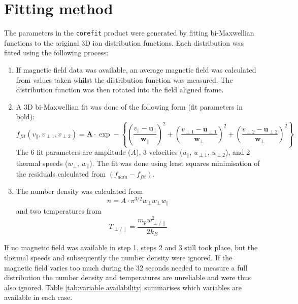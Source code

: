 \documentclass[11pt,a4paper]{article}
\begin{document}
\section{Fitting method}
The parameters in the \texttt{corefit} product were generated by fitting bi-Maxwellian functions to the original 3D ion distribution functions. Each distribution was fitted using the following process:
\begin{enumerate}
	\item If magnetic field data was available, an average magnetic field was calculated from values taken whilst the distribution function was measured. The distribution function was then rotated into the field aligned frame.
	\item A 3D bi-Maxwellian fit was done of the following form (fit parameters in bold):
	\begin{equation}
		f_{fit} \left ( v_{\parallel}, v_{\perp 1}, v_{\perp 2} \right ) = \mathbf{A} \cdot \exp - \left \{ \left ( \frac{v_{\parallel} - \mathbf{u}_{\parallel}}{\mathbf{w}_{\parallel}} \right )^{2} + \left ( \frac{v_{\perp 1} - \mathbf{u}_{\perp 1}}{\mathbf{w}_{\perp}} \right )^{2} + \left ( \frac{v_{\perp 2} - \mathbf{u}_{\perp 2}}{\mathbf{w}_{\perp}} \right )^{2} \right \}
	\end{equation}
	The 6 fit parameters are amplitude ($A$), 3 velocities ($u_{\parallel}$, $u_{\perp 1}$, $u_{\perp 2}$), and 2 thermal speeds ($w_{\perp}$, $w_{\parallel}$). The fit was done using least squares minimisation of the residuals calculated from $\left (f_{data} - f_{fit}\right )$.
	\item The number density was calculated from
	\begin{equation}
		n = A \cdot \pi^{3/2}w_{\perp}w_{\perp}w_{\parallel}
	\end{equation}
	and two temperatures from
	\begin{equation}
		T_{\perp / \parallel} = \frac{m_{p}w_{\perp / \parallel}^{2}}{2k_{B}}
	\end{equation}
\end{enumerate}
If no magnetic field was available in step 1, steps 2 and 3 still took place, but the thermal speeds and subsequently the number density were ignored. If the magnetic field varies too much during the 32 seconds needed to measure a full distribution the number density and temperatures are unreliable and were thus also ignored. Table \ref{tab:variable availability} summarises which variables are available in each case.
\end{document}
